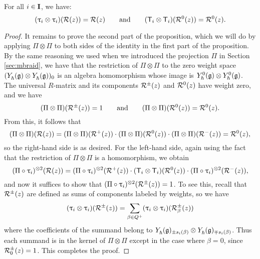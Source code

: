 \begin{proposition}\label{P:braid-R}
    For all $i\in\I$, we have:
    \[(\braid_i\otimes\braid_i)(\rmat(z)) = \rmat(z) \qquad\text{and}\qquad (\mbraid_i\otimes\mbraid_i)(\rmat^0(z)) = \rmat^0(z).\]
\end{proposition}
\begin{proof}
    It remains to prove the second part of the proposition, which we will do by applying $\Pi\otimes\Pi$ to both sides of the identity in the first part of the proposition.
    By the same reasoning we used when we introduced the projection $\Pi$ in Section \ref{sec:mbraid}, we have that the restriction of $\Pi\otimes\Pi$ to the zero weight space $(\Yhg\otimes\Yhg)_0$ is an algebra homomorphism whose image is $\Yhg[0]\otimes\Yhg[0]$.
    The universal $R$-matrix and its components $\rmat^\pm(z)$ and $\rmat^0(z)$ have weight zero, and we have
    \[(\Pi\otimes\Pi)(\rmat^\pm(z)) = 1 \qquad\text{and}\qquad (\Pi\otimes\Pi)(\rmat^0(z)) = \rmat^0(z).\]
    From this, it follows that
    \[(\Pi\otimes\Pi)(\rmat(z)) = (\Pi\otimes\Pi)(\rmat^+(z)) \cdot (\Pi\otimes\Pi)(\rmat^0(z)) \cdot (\Pi\otimes\Pi)(\rmat^-(z)) = \rmat^0(z),\]
    so the right-hand side is as desired.
    For the left-hand side, again using the fact that the restriction of $\Pi\otimes\Pi$ is a homomorphism, we obtain
    \[(\Pi\circ\braid_i)^{\otimes 2}(\rmat(z)) = (\Pi\circ\braid_i)^{\otimes 2}(\rmat^+(z)) \cdot (\mbraid_i\otimes\mbraid_i)(\rmat^0(z)) \cdot (\Pi\circ\braid_i)^{\otimes 2}(\rmat^-(z)),\]
    and now it suffices to show that $(\Pi\circ\braid_i)^{\otimes 2}(\rmat^\pm(z))=1$.
    To see this, recall that $\rmat^\pm(z)$ are defined as sums of components labeled by weights, so we have
    \[(\braid_i\otimes\braid_i)(\rmat^\pm(z)) = \sum_{\beta\in Q^+}(\braid_i\otimes\braid_i)(\rmat_\beta^\pm(z))\]
    where the coefficients of the summand belong to $\Yhg_{\pm s_i(\beta)}\otimes\Yhg_{\mp s_i(\beta)}$.
    Thus each summand is in the kernel of $\Pi\otimes\Pi$ except in the case where $\beta=0$, since $\rmat_0^\pm(z)=1$.
    This completes the proof.
\end{proof}
